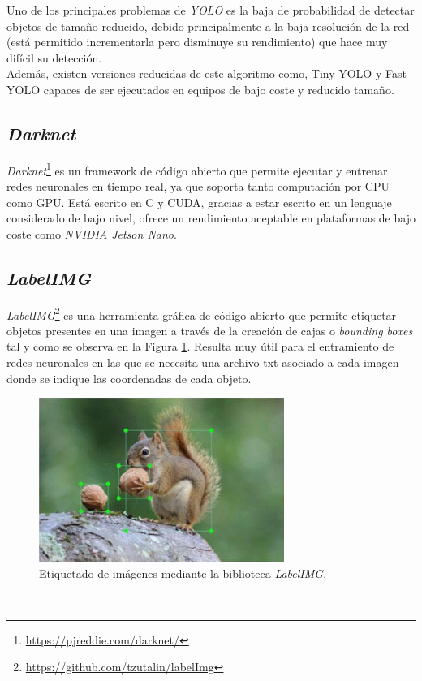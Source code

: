 Uno de los principales problemas de \textit{YOLO} es la baja de probabilidad de detectar objetos de tamaño reducido, debido principalmente a la baja resolución de la red (está permitido incrementarla pero disminuye su rendimiento) que hace muy difícil su detección.\\

Además, existen versiones reducidas de este algoritmo como, Tiny-YOLO y Fast YOLO capaces de ser ejecutados en equipos de bajo coste y reducido tamaño.\\

\subsection{\textit{Darknet}}
\label{subsection:darknet}
\textit{Darknet}\footnote{\url{https://pjreddie.com/darknet/}} es un framework de código abierto que permite ejecutar y entrenar redes neuronales en tiempo real, ya que soporta tanto computación por CPU como GPU. Está escrito en C y CUDA, gracias a estar escrito en un lenguaje considerado de bajo nivel, ofrece un rendimiento aceptable en plataformas de bajo coste como \textit{NVIDIA Jetson Nano}.\\

\subsection{\textit{LabelIMG}}
\textit{LabelIMG}\footnote{\url{https://github.com/tzutalin/labelImg}} es una herramienta gráfica de código abierto que permite etiquetar objetos presentes en una imagen a través de la creación de cajas o \textit{bounding boxes} tal y como se observa en la Figura \ref{fig:labelimg}. Resulta muy útil para el entramiento de redes neuronales en las que se necesita una archivo txt asociado a cada imagen donde se indique las coordenadas de cada objeto.

\begin{figure} [h!]
	\begin{center}
		\includegraphics[width=8cm]{figs/labelimg}
	\end{center}
	\caption{Etiquetado de imágenes mediante la biblioteca \textit{LabelIMG}.}
	\label{fig:labelimg}
\end{figure}\


